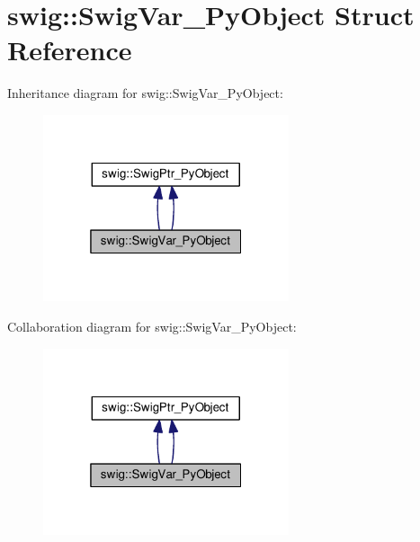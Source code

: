 \hypertarget{structswig_1_1SwigVar__PyObject}{}\section{swig\+:\+:Swig\+Var\+\_\+\+Py\+Object Struct Reference}
\label{structswig_1_1SwigVar__PyObject}


Inheritance diagram for swig\+:\+:Swig\+Var\+\_\+\+Py\+Object\+:\nopagebreak
\begin{figure}[H]
\begin{center}
\leavevmode
\includegraphics[width=205pt]{structswig_1_1SwigVar__PyObject__inherit__graph}
\end{center}
\end{figure}


Collaboration diagram for swig\+:\+:Swig\+Var\+\_\+\+Py\+Object\+:\nopagebreak
\begin{figure}[H]
\begin{center}
\leavevmode
\includegraphics[width=205pt]{structswig_1_1SwigVar__PyObject__coll__graph}
\end{center}
\end{figure}
